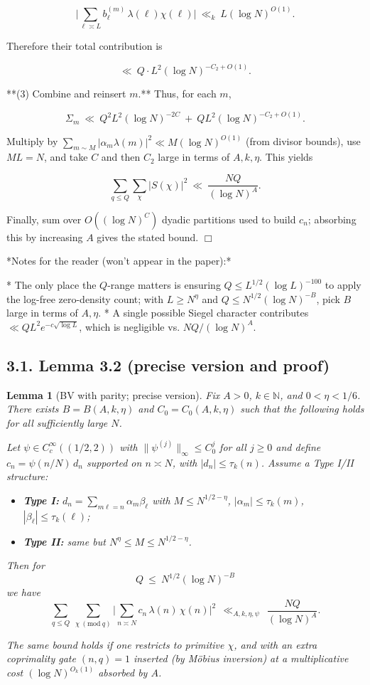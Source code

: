\documentclass[11pt]{article}
\newtheorem{lemma}{Lemma}[section]
\theoremstyle{definition}
\theoremstyle{remark}
\begin{document}
$$
\Big|\sum_{\ell\asymp L} b^{(m)}_\ell\,\lambda(\ell)\chi(\ell)\Big|
\ \ll_k\ L(\log N)^{O(1)}.
$$

Therefore their total contribution is

$$
\ll\ Q\cdot L^2 (\log N)^{-C_2+O(1)}.
$$

**(3) Combine and reinsert $m$.**
Thus, for each $m$,

$$
\Sigma_m\ \ll\ Q^2 L^2 (\log N)^{-2C} \ +\ Q L^2 (\log N)^{-C_2+O(1)}.
$$

Multiply by $\sum_{m\sim M}|\alpha_m\lambda(m)|^2\ll M(\log N)^{O(1)}$ (from divisor bounds), use $ML=N$, and take $C$ and then $C_2$ large in terms of $A,k,\eta$. This yields

$$
\sum_{q\le Q}\sum_{\chi}|S(\chi)|^2\ \ll\ \frac{NQ}{(\log N)^A}.
$$

Finally, sum over $O((\log N)^C)$ dyadic partitions used to build $c_n$; absorbing this by increasing $A$ gives the stated bound. $\Box$

*Notes for the reader (won’t appear in the paper):*

* The only place the $Q$-range matters is ensuring $Q\le L^{1/2}(\log L)^{-100}$ to apply the log-free zero-density count; with $L\ge N^{\eta}$ and $Q\le N^{1/2}(\log N)^{-B}$, pick $B$ large in terms of $A,\eta$.
* A single possible Siegel character contributes $\ll Q L^2 e^{-c\sqrt{\log L}}$, which is negligible vs. $NQ/(\log N)^A$.

\subsection*{3.1. Lemma 3.2 (precise version and proof)}

\begin{lemma}[BV with parity; precise version]\label{lem:BV-parity-precise}
Fix $A>0$, $k\in\mathbb N$, and $0<\eta<1/6$. There exists $B=B(A,k,\eta)$ and $C_0=C_0(A,k,\eta)$ such that the following holds for all sufficiently large $N$.

Let $\psi\in C_c^\infty((1/2,2))$ with $\|\psi^{(j)}\|_\infty\le C_0^{j}$ for all $j\ge 0$ and define $c_n = \psi(n/N)\,d_n$ supported on $n\asymp N$, with $|d_n|\le \tau_k(n)$. Assume a Type I/II structure:

\begin{itemize}
  \item \textbf{Type I:} $d_n=\sum_{m\ell=n}\alpha_m\beta_\ell$ with $M\le N^{1/2-\eta}$, $|\alpha_m|\le \tau_k(m)$, $|\beta_\ell|\le \tau_k(\ell)$;
  \item \textbf{Type II:} same but $N^{\eta}\le M\le N^{1/2-\eta}$.
\end{itemize}

Then for
\[
Q\ \le\ N^{1/2}(\log N)^{-B}
\]
we have
\[
\sum_{q\le Q}\ \sum_{\chi\ (\mathrm{mod}\ q)}\Bigg|\sum_{n\asymp N} c_n\,\lambda(n)\,\chi(n)\Bigg|^2\ \ \ll_{A,k,\eta,\psi}\ \ \frac{NQ}{(\log N)^A}.
\]

The same bound holds if one restricts to primitive $\chi$, and with an extra coprimality gate $(n,q)=1$ inserted (by Möbius inversion) at a multiplicative cost $(\log N)^{O_{k}(1)}$ absorbed by $A$.
\end{lemma}
\end{document}
